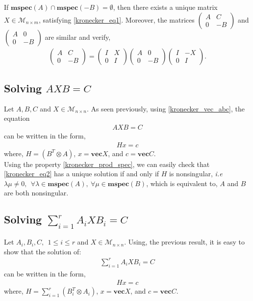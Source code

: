 \begin{proposition}
If $\mathbf{mspec}(A) \cap \mathbf{mspec}(-B) = \emptyset$, then there exists a unique matrix $X \in \mathcal{M}_{n \times m}$, satisfying \ref{kronecker_eq1}. Moreover, the matrices $\left(\begin{array}{cc}
A & C
\\
0 & -B
\end{array}\right)$ and $\left(\begin{array}{cc}
A & 0
\\
0 & -B
\end{array}\right)$ are similar and verify,
\begin{align}
\left(\begin{array}{cc}
A & C
\\
0 & -B
\end{array}\right) = \left(\begin{array}{cc}
I & X
\\
0 & I
\end{array}\right)
\left(\begin{array}{cc}
A & 0
\\
0 & -B
\end{array}\right)
\left(\begin{array}{cc}
I & -X
\\
0 & I
\end{array}\right).
\end{align}
\end{proposition}

\subsection{Solving $AXB=C$}
Let $A,B,C$ and $X \in \mathcal{M}_{n \times n}$. As seen previously, using \ref{kronecker_vec_abc}, the equation 
\begin{align}
\label{kronecker_eq2}
AXB=C
\end{align}
can be written in the form,
\begin{align}
H x = c
\end{align}
where,
$H = (B^T \otimes A)$, $x = \mathbf{vec}X $, and $c = \mathbf{vec}C$.
\\
Using the property \ref{kronecker_prod_spec}, we can easily check that \ref{kronecker_eq2} has a unique solution if and only if $H$ is nonsingular, \textit{i.e} $\lambda  \mu \neq 0,~~\forall \lambda \in \mathbf{mspec}(A),~\forall \mu \in \mathbf{mspec}(B)$, which is equivalent to, $A$ and $B$ are both nonsingular.

\subsection{Solving $\sum_{i=1}^r A_i X B_i=C$}
Let $A_i,B_i,C,~~1 \leq i \leq r$ and $X \in \mathcal{M}_{n \times n}$. Using, the previous result, it is easy to show that the solution of:
\begin{align}
\label{kronecker_eq3}
\sum_{i=1}^r A_i X B_i=C
\end{align}
can be written in the form,
\begin{align}
H x = c
\end{align}
where,
$H = \sum_{i=1}^r (B_i^T \otimes A_i)$, $x = \mathbf{vec}X $, and $c = \mathbf{vec}C$.